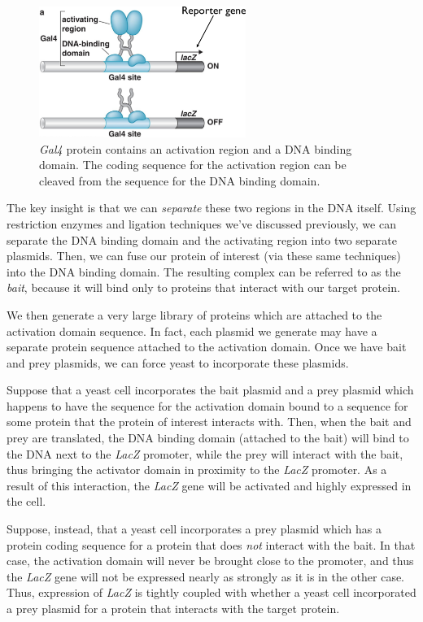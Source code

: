 \documentclass{article}
\begin{document}
\begin{figure}[h!]
    \begin{center}
        \includegraphics[width=0.6\textwidth]{images/gal4.png}
    \end{center}
    \caption{
        \emph{Gal4} protein contains an activation region and a DNA binding domain. The coding
        sequence for the activation region can be cleaved from the sequence for the DNA binding
        domain.
    }
\end{figure}

The key insight is that we can \emph{separate} these two regions in the DNA itself. Using
restriction enzymes and ligation techniques we've discussed previously, we can separate the DNA
binding domain and the activating region into two separate plasmids. Then, we can fuse our protein
of interest (via these same techniques) into the DNA binding domain. The resulting complex can be
referred to as the \emph{bait}, because it will bind only to proteins that interact with our target
protein.

We then generate a very large library of proteins which are attached to the activation domain
sequence. In fact, each plasmid we generate may have a separate protein sequence attached to the
activation domain. Once we have bait and prey plasmids, we can force yeast to incorporate these
plasmids.

Suppose that a yeast cell incorporates the bait plasmid and a prey plasmid which happens to have the
sequence for the activation domain bound to a sequence for some protein that the protein of interest
interacts with. Then, when the bait and prey are translated, the DNA binding domain (attached to the
bait) will bind to the DNA next to the \emph{LacZ} promoter, while the prey will interact with the
bait, thus bringing the activator domain in proximity to the \emph{LacZ} promoter. As a result of
this interaction, the \emph{LacZ} gene will be activated and highly expressed in the cell.

Suppose, instead, that a yeast cell incorporates a prey plasmid which has a protein coding sequence
for a protein that does \emph{not} interact with the bait. In that case, the activation domain will
never be brought close to the promoter, and thus the \emph{LacZ} gene will not be expressed nearly
as strongly as it is in the other case. Thus, expression of \emph{LacZ} is tightly coupled with
whether a yeast cell incorporated a prey plasmid for a protein that interacts with the target
protein.
\end{document}
